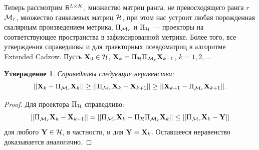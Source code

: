 \documentclass[12pt,a4paper,fleqn,leqno]{article}
\newtheorem{proposition}{Утверждение}%
\begin{document}
Теперь рассмотрим $\mathsf{R}^{L \times K}$, множество матриц ранга, не превосходящего ранга $r$ $\mathcal{M}_r$, множество ганкелевых матриц $\mathcal{H}$, при этом нас устроит любая порожденная скалярным произведением метрика, $\Pi_{\mathcal{M}_r}$ и $\Pi_{\mathcal{H}}$ --- проекторы на соответствующее пространства в зафиксированной метрике. Более того, все утверждения справедливы и для траекторных псевдоматриц в алгоритме Extended Cadzow. Пусть $\mathbf{X}_0 \in \mathcal{H}$, $\mathbf{X}_k = \Pi_{\mathcal{H}} \Pi_{\mathcal{M}_r} \mathbf{X}_{k - 1}$, $k = 1, 2, \ldots$
\begin{proposition}\label{chuprop}
\cite{Chu2003} Справедливы следующие неравенства:
\begin{equation*}
||\mathbf{X}_k - \Pi_{\mathcal{M}_r} \mathbf{X}_k|| \ge ||\Pi_{\mathcal{M}_r} \mathbf{X}_k - \mathbf{X}_{k + 1}|| \ge ||\mathbf{X}_{k+1} - \Pi_{\mathcal{M}_r} \mathbf{X}_{k + 1}||.
\end{equation*}
\end{proposition}
\begin{proof}
Для проектора $\Pi_{\mathcal{H}}$ справедливо:
\begin{equation*}
||\Pi_{\mathcal{M}_r} \mathbf{X}_k - \mathbf{X}_{k + 1}|| = ||\Pi_{\mathcal{M}_r} \mathbf{X}_k - \Pi_{\mathcal{H}} \Pi_{\mathcal{M}_r} \mathbf{X}_k|| \le ||\Pi_{\mathcal{M}_r} \mathbf{X}_k - \mathbf{Y}||
\end{equation*}
для любого $\mathbf{Y} \in \mathcal{H}$, в частности, и для $\mathbf{Y} = \mathbf{X}_k$. Оставшееся неравенство доказывается аналогично.
\end{proof}
\end{document}

